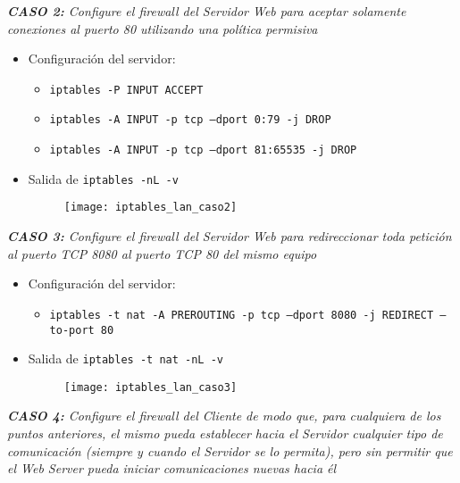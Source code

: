 \emph{\textbf{CASO 2:} Configure el firewall del Servidor Web para aceptar solamente conexiones al puerto 80 utilizando una política permisiva} 
~\\

\begin{itemize}
    \item Configuración del servidor:
    \begin{itemize}
        \item \texttt{iptables -P INPUT ACCEPT} 
        \item \texttt{iptables -A INPUT -p tcp --dport 0:79 -j DROP} 
        \item \texttt{iptables -A INPUT -p tcp --dport 81:65535 -j DROP} 
    \end{itemize}
    \item Salida de \texttt{iptables -nL -v} 
    \begin{figure}[H]
        \centering
        \texttt{[image: iptables\_lan\_caso2]}
    \end{figure}
\end{itemize}

\emph{\textbf{CASO 3:} Configure el firewall del Servidor Web para redireccionar toda petición al puerto TCP 8080 al puerto TCP 80 del mismo equipo} 
~\\

\begin{itemize}
    \item Configuración del servidor:
    \begin{itemize}
        \item \texttt{iptables -t nat -A PREROUTING -p tcp --dport 8080 -j REDIRECT --to-port 80} 
    \end{itemize}
    \item Salida de \texttt{iptables -t nat -nL -v} 
    \begin{figure}[H]
        \centering
        \texttt{[image: iptables\_lan\_caso3]}
    \end{figure}
\end{itemize}

\emph{\textbf{CASO 4:} Configure el firewall del Cliente de modo que, para cualquiera de los puntos anteriores, el mismo pueda establecer hacia el Servidor cualquier tipo de comunicación (siempre y cuando el Servidor se lo permita), pero sin permitir que el Web Server pueda iniciar comunicaciones nuevas hacia él} 
~\\

